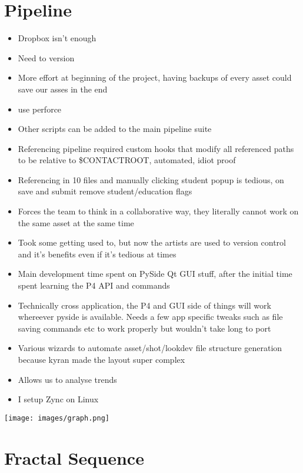 \documentclass[11pt,a4paper,final,notitlepage]{report}
\begin{document}
\chapter{Pipeline}

\begin{itemize}
	\item Dropbox isn't enough
	\item Need to version
	\item More effort at beginning of the project, having backups of every asset could save our asses in the end
	\item use perforce
	\item Other scripts can be added to the main pipeline suite
	\item Referencing pipeline required custom hooks that modify all referenced paths to be relative to \$CONTACTROOT, automated, idiot proof
	\item Referencing in 10 files and manually clicking student popup is tedious, on save and submit remove student/education flags
	\item Forces the team to think in a collaborative way, they literally cannot work on the same asset at the same time
	\item Took some getting used to, but now the artists are used to version control and it's benefits even if it's tedious at times
	\item Main development time spent on PySide Qt GUI stuff, after the initial time spent learning the P4 API and commands
	\item Technically cross application, the P4 and GUI side of things will work whereever pyside is available. Needs a few app specific tweaks such as file saving commands etc to work properly but wouldn't take long to port
	\item Various wizards to automate asset/shot/lookdev file structure generation because kyran made the layout super complex
	\item Allows us to analyse trends
	\item I setup Zync on Linux
\end{itemize}


\texttt{[image: images/graph.png]}





\chapter{Fractal Sequence}
\end{document}
